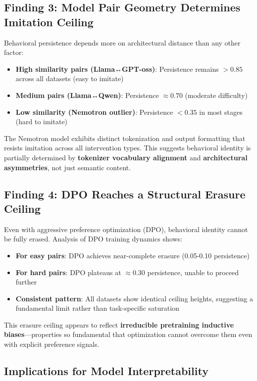 \documentclass{article}
\begin{document}
\subsection*{Finding 3: Model Pair Geometry Determines Imitation Ceiling}

Behavioral persistence depends more on architectural distance than any other factor:
\begin{itemize}
\item \textbf{High similarity pairs (Llama↔GPT-oss)}: Persistence remains $>0.85$ across all datasets (easy to imitate)
\item \textbf{Medium pairs (Llama↔Qwen)}: Persistence $\approx 0.70$ (moderate difficulty)
\item \textbf{Low similarity (Nemotron outlier)}: Persistence $<0.35$ in most stages (hard to imitate)
\end{itemize}

The Nemotron model exhibits distinct tokenization and output formatting that resists imitation across all intervention types. This suggests behavioral identity is partially determined by \textbf{tokenizer vocabulary alignment} and \textbf{architectural asymmetries}, not just semantic content.

\subsection*{Finding 4: DPO Reaches a Structural Erasure Ceiling}

Even with aggressive preference optimization (DPO), behavioral identity cannot be fully erased. Analysis of DPO training dynamics shows:
\begin{itemize}
\item \textbf{For easy pairs}: DPO achieves near-complete erasure (0.05-0.10 persistence)
\item \textbf{For hard pairs}: DPO plateaus at $\approx 0.30$ persistence, unable to proceed further
\item \textbf{Consistent pattern}: All datasets show identical ceiling heights, suggesting a fundamental limit rather than task-specific saturation
\end{itemize}

This erasure ceiling appears to reflect \textbf{irreducible pretraining inductive biases}—properties so fundamental that optimization cannot overcome them even with explicit preference signals.

\subsection*{Implications for Model Interpretability}
\end{document}
